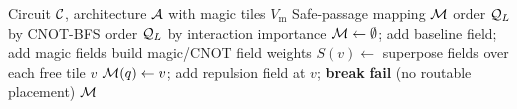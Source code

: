 \begin{algorithm}[t]
\caption{Gaussian field placement}
\label{alg:main}
\begin{algorithmic}[1]
    \Require Circuit $\mathcal{C}$, architecture $\mathcal{A}$ with magic tiles $V_{\mathrm m}$
    \Ensure Safe-passage mapping $\mathcal{M}$
        \State order $\mathcal{Q}_L$ by CNOT-BFS
    \Else
        \State order $\mathcal{Q}_L$ by interaction importance
    \EndIf
    \State $\mathcal{M} \gets \emptyset$;\; add baseline field; add magic fields
        \State build magic/CNOT field weights
        \State $S(v)\gets$ superpose fields over each free tile $v$
                \State $\mathcal{M}(q)\gets v$;\; add repulsion field at $v$;\; \textbf{break}
            \EndIf
        \EndFor
         \State \textbf{fail} (no routable placement) \EndIf
    \EndFor
    \State \Return $\mathcal{M}$
\end{algorithmic}
\end{algorithm}
